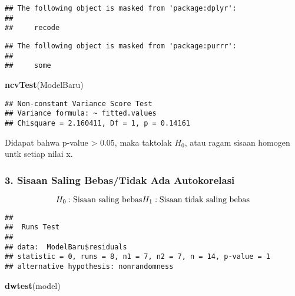 \documentclass[
]{article}
\newenvironment{Shaded}{\begin{snugshade}}{\end{snugshade}}
\newcommand{\FunctionTok}[1]{\textcolor[rgb]{0.13,0.29,0.53}{\textbf{#1}}}
\newcommand{\NormalTok}[1]{#1}
\newcommand{\SpecialCharTok}[1]{\textcolor[rgb]{0.81,0.36,0.00}{\textbf{#1}}}
\begin{document}
\begin{verbatim}
## The following object is masked from 'package:dplyr':
## 
##     recode
\end{verbatim}

\begin{verbatim}
## The following object is masked from 'package:purrr':
## 
##     some
\end{verbatim}

\begin{Shaded}
\begin{Highlighting}[]
\FunctionTok{ncvTest}\NormalTok{(ModelBaru)}
\end{Highlighting}
\end{Shaded}

\begin{verbatim}
## Non-constant Variance Score Test 
## Variance formula: ~ fitted.values 
## Chisquare = 2.160411, Df = 1, p = 0.14161
\end{verbatim}

Didapat bahwa p-value \textgreater{} 0.05, maka taktolak \(H_0\), atau
ragam sisaan homogen untk setiap nilai x.

\hypertarget{sisaan-saling-bebastidak-ada-autokorelasi-1}{%
\subsubsection{3. Sisaan Saling Bebas/Tidak Ada
Autokorelasi}\label{sisaan-saling-bebastidak-ada-autokorelasi-1}}

\[
H_0 : \text{Sisaan saling bebas}\\H_1 : \text{Sisaan tidak saling bebas}
\]

\begin{Shaded}
\end{Shaded}

\begin{verbatim}
## 
##  Runs Test
## 
## data:  ModelBaru$residuals
## statistic = 0, runs = 8, n1 = 7, n2 = 7, n = 14, p-value = 1
## alternative hypothesis: nonrandomness
\end{verbatim}

\begin{Shaded}
\begin{Highlighting}[]
\FunctionTok{dwtest}\NormalTok{(model)}
\end{Highlighting}
\end{Shaded}
\end{document}

